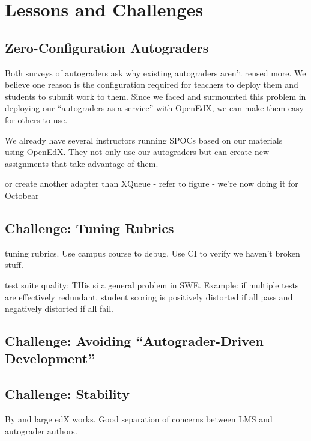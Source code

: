 \section{Lessons and Challenges}

\subsection{Zero-Configuration Autograders}

Both  surveys of autograders ask why existing autograders aren't reused more.
We believe one reason is the configuration required for teachers to deploy them and
students to submit work to them.  Since we
faced and surmounted this problem in deploying our ``autograders as a
service'' with OpenEdX, we can make them easy for others to use.

We already have several instructors running SPOCs based on our
materials~\cite{moocs-spocs-TR} using OpenEdX.  They not only use our
autograders but can create new assignments that take advantage of them.

or create another adapter than XQueue - refer to figure - we're now
doing it for Octobear

\subsection{Challenge: Tuning Rubrics}

tuning rubrics. Use campus course to debug. Use CI to
verify we haven't broken stuff.

test suite quality: THis si a general problem in SWE. Example: if multiple tests are effectively redundant, student scoring is positively distorted if all pass and negatively distorted if all fail.


\subsection{Challenge: Avoiding ``Autograder-Driven Development''}

\subsection{Challenge: Stability}

By and large edX works.  Good separation
of concerns between LMS and autograder authors.




